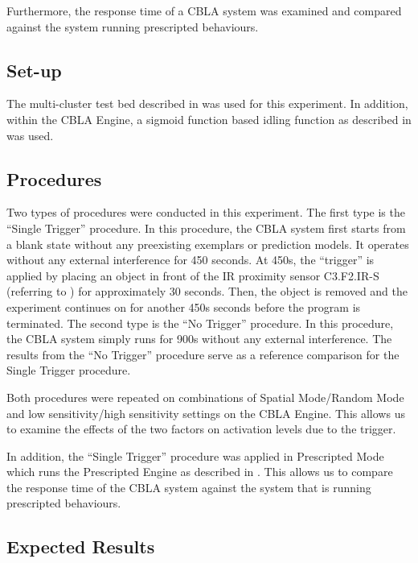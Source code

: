 Furthermore, the response time of a CBLA system was examined and compared against the system running prescripted behaviours.


\subsection{Set-up}\label{sec:multi-cluster-setup}

The multi-cluster test bed described in  was used for this experiment. In addition, within the CBLA Engine, a sigmoid function based idling function as described in  was used.


\subsection{Procedures}

Two types of procedures were conducted in this experiment. 
The first type is the ``Single Trigger'' procedure. In this procedure, the CBLA system first starts from a blank state without any preexisting exemplars or prediction models. It operates without any external interference for 450 seconds. At 450s, the ``trigger'' is applied by placing an object in front of the IR proximity sensor C3.F2.IR-S (referring to ) for approximately 30 seconds. Then, the object is removed and the experiment continues on for another 450s seconds before the program is terminated. 
The second type is the ``No Trigger'' procedure. In this procedure, the CBLA system simply runs for 900s without any external interference. The results from the ``No Trigger'' procedure serve as a reference comparison for the Single Trigger procedure.

Both procedures were repeated on combinations of Spatial Mode/Random Mode and low sensitivity/high sensitivity settings on the CBLA Engine. This allows us to examine the effects of the two factors on activation levels due to the trigger. 

In addition, the ``Single Trigger'' procedure was applied in Prescripted Mode which runs the Prescripted Engine as described in . This allows us to compare the response time of the CBLA system against the system that is running prescripted behaviours.

\subsection{Expected Results}

